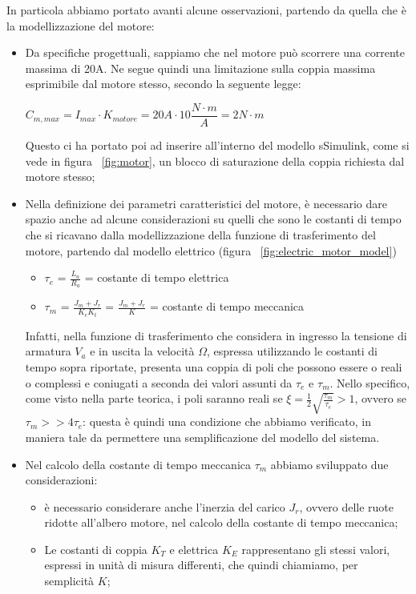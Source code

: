 In particola abbiamo portato avanti alcune osservazioni, partendo da quella che è la modellizzazione del motore:
\begin{itemize}
	\item Da specifiche progettuali, sappiamo che nel motore può scorrere una corrente massima di 20A. Ne segue quindi una limitazione sulla coppia massima esprimibile dal motore stesso, secondo la seguente legge:
	\begin{center}
		$C_{m,max} = I_{max}\cdot{K_{motore}} = 20 A\cdot{10 \dfrac{N\cdot{m}}{A}}=2N\cdot{m}$
	\end{center}
	Questo ci ha portato poi ad inserire all'interno del modello sSimulink, come si vede in figura ~\ref{fig:motor}, un blocco di saturazione della coppia richiesta dal motore stesso;
	\item Nella definizione dei parametri caratteristici del motore, è necessario dare spazio anche ad alcune considerazioni su quelli che sono le costanti di tempo che si ricavano dalla modellizzazione della funzione di trasferimento del motore, partendo dal modello elettrico (figura ~\ref{fig:electric_motor_model})
	\begin{itemize}
		\item $\tau_e$ = $\frac{L_a}{R_a}$ = costante di tempo elettrica
		\item $\tau_m$ = $\frac{J_m + J_r}{K_e K_t}$ = $\frac{J_m + J_r}{K}$ = costante di tempo meccanica
	\end{itemize}

	Infatti, nella funzione di trasferimento che considera in ingresso la tensione di armatura $V_a$ e in uscita la velocità $\Omega$, espressa utilizzando le costanti di tempo sopra riportate, presenta una coppia di poli che possono essere o reali o complessi e coniugati a seconda dei valori assunti da $\tau_e$ e $\tau_m$.
	Nello specifico, come visto nella parte teorica, i poli saranno reali se $\xi = \frac{1}{2}\sqrt{\frac{\tau_m}{\tau_e}}>1$, ovvero se $\tau_m >> 4\tau_e$: questa è quindi una condizione che abbiamo verificato, in maniera tale da permettere una semplificazione del modello del sistema.
	\item Nel calcolo della costante di tempo meccanica $\tau_m$ abbiamo sviluppato due considerazioni:
	\begin{itemize}
		\item è necessario considerare anche l'inerzia del carico $J_r$, ovvero delle ruote ridotte all'albero motore, nel calcolo della costante di tempo meccanica;
		\item Le costanti di coppia $K_T$ e elettrica $K_E$ rappresentano gli stessi valori, espressi in unità di misura differenti, che quindi chiamiamo, per semplicità $K$;
	\end{itemize}
\end{itemize}

